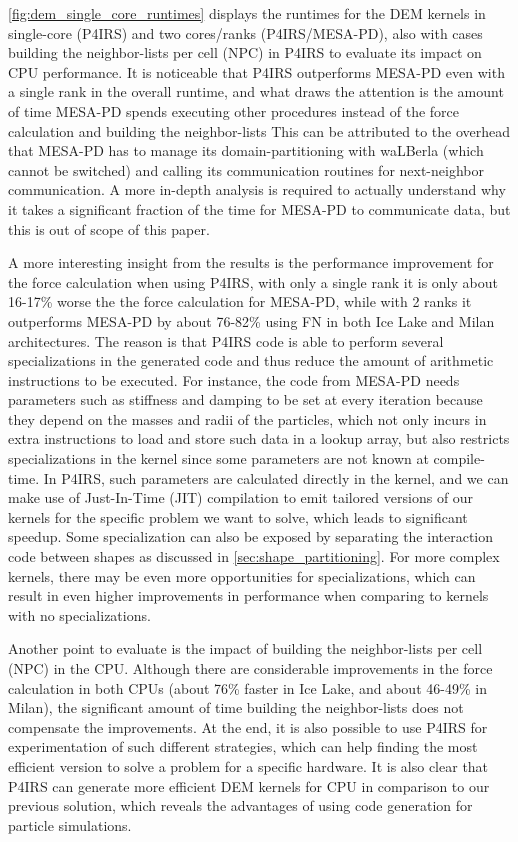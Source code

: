 \documentclass[preprint,12pt]{elsarticle}
\begin{document}
\autoref{fig:dem_single_core_runtimes} displays the runtimes for the \ac{DEM} kernels in single-core (P4IRS) and two cores/ranks (P4IRS/MESA-PD), also with cases building the neighbor-lists per cell (NPC) in P4IRS to evaluate its impact on CPU performance.
It is noticeable that P4IRS outperforms MESA-PD even with a single rank in the overall runtime, and what draws the attention is the amount of time MESA-PD spends executing other procedures instead of the force calculation and building the neighbor-lists
This can be attributed to the overhead that MESA-PD has to manage its domain-partitioning with waLBerla (which cannot be switched) and calling its communication routines for next-neighbor communication.
A more in-depth analysis is required to actually understand why it takes a significant fraction of the time for MESA-PD to communicate data, but this is out of scope of this paper.

A more interesting insight from the results is the performance improvement for the force calculation when using P4IRS, with only a single rank it is only about 16-17\% worse the the force calculation for MESA-PD, while with 2 ranks it outperforms MESA-PD by about 76-82\% using \ac{FN} in both Ice Lake and Milan architectures.
The reason is that P4IRS code is able to perform several specializations in the generated code and thus reduce the amount of arithmetic instructions to be executed.
For instance, the code from MESA-PD needs parameters such as stiffness and damping to be set at every iteration because they depend on the masses and radii of the particles, which not only incurs in extra instructions to load and store such data in a lookup array, but also restricts specializations in the kernel since some parameters are not known at compile-time.
In P4IRS, such parameters are calculated directly in the kernel, and we can make use of Just-In-Time (JIT) compilation to emit tailored versions of our kernels for the specific problem we want to solve, which leads to significant speedup.
Some specialization can also be exposed by separating the interaction code between shapes as discussed in \autoref{sec:shape_partitioning}.
For more complex kernels, there may be even more opportunities for specializations, which can result in even higher improvements in performance when comparing to kernels with no specializations.

Another point to evaluate is the impact of building the neighbor-lists per cell (NPC) in the CPU.
Although there are considerable improvements in the force calculation in both CPUs (about 76\% faster in Ice Lake, and about 46-49\% in Milan), the significant amount of time building the neighbor-lists does not compensate the improvements.
At the end, it is also possible to use P4IRS for experimentation of such different strategies, which can help finding the most efficient version to solve a problem for a specific hardware.
It is also clear that P4IRS can generate more efficient DEM kernels for CPU in comparison to our previous solution, which reveals the advantages of using code generation for particle simulations.
\end{document}
